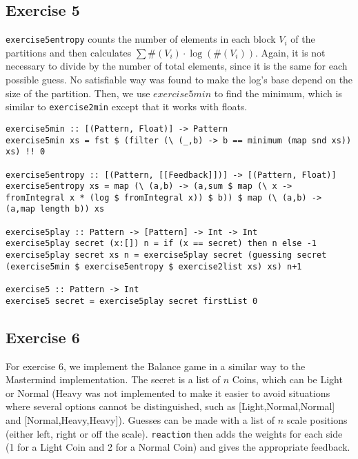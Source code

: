 \documentclass[a4paper,12pt]{amsart}
\begin{document}
\subsection*{Exercise 5}
\texttt{exercise5entropy} counts the number of elements in each block $V_i$ of the partitions and then calculates $\sum \#(V_i) \cdot \log (\#(V_i))$. Again, it is not necessary to divide by the number of total elements, since it is the same for each possible guess. No satisfiable way was found to make the log's base depend on the size of the partition. Then, we use $exercise5min$ to find the minimum, which is similar to \texttt{exercise2min} except that it works with floats.
\begin{verbatim}
exercise5min :: [(Pattern, Float)] -> Pattern
exercise5min xs = fst $ (filter (\ (_,b) -> b == minimum (map snd xs)) xs) !! 0

exercise5entropy :: [(Pattern, [[Feedback]])] -> [(Pattern, Float)]
exercise5entropy xs = map (\ (a,b) -> (a,sum $ map (\ x -> fromIntegral x * (log $ fromIntegral x)) $ b)) $ map (\ (a,b) -> (a,map length b)) xs

exercise5play :: Pattern -> [Pattern] -> Int -> Int
exercise5play secret (x:[]) n = if (x == secret) then n else -1
exercise5play secret xs n = exercise5play secret (guessing secret (exercise5min $ exercise5entropy $ exercise2list xs) xs) n+1

exercise5 :: Pattern -> Int
exercise5 secret = exercise5play secret firstList 0
\end{verbatim}

\subsection*{Exercise 6}
For exercise 6, we implement the Balance game in a similar way to the Mastermind implementation. The secret is a list of $n$ Coins, which can be Light or Normal (Heavy was not implemented to make it easier to avoid situations where several options cannot be distinguished, such as [Light,Normal,Normal] and [Normal,Heavy,Heavy]). Guesses can be made with a list of $n$ scale positions (either left, right or off the scale). \texttt{reaction} then adds the weights for each side (1 for a Light Coin and 2 for a Normal Coin) and gives the appropriate feedback.
\end{document}
